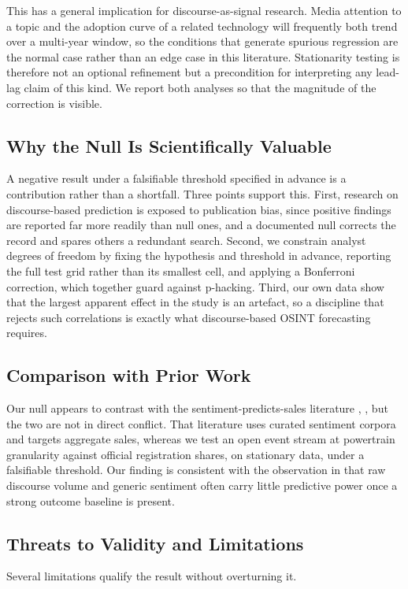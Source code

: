 \documentclass[conference]{IEEEtran}
\begin{document}
This has a general implication for discourse-as-signal research. Media attention
to a topic and the adoption curve of a related technology will frequently both
trend over a multi-year window, so the conditions that generate spurious
regression are the normal case rather than an edge case in this literature.
Stationarity testing is therefore not an optional refinement but a precondition
for interpreting any lead-lag claim of this kind. We report both analyses so
that the magnitude of the correction is visible.

\subsection{Why the Null Is Scientifically Valuable}
A negative result under a falsifiable threshold specified in advance is a
contribution rather than a shortfall. Three points support this. First,
research on discourse-based prediction is exposed to publication bias, since
positive findings are reported far more readily than null ones, and a documented
null corrects the record and spares others a redundant search. Second, we
constrain analyst degrees of freedom by fixing the hypothesis and threshold in
advance, reporting the full test grid rather than its smallest cell, and
applying a Bonferroni correction, which together guard against p-hacking. Third,
our own data show that the largest apparent effect in the study is an artefact,
so a discipline that rejects such correlations is exactly what
discourse-based OSINT forecasting requires.

\subsection{Comparison with Prior Work}
Our null appears to contrast with the sentiment-predicts-sales literature
\cite{shao2025}, \cite{liu2025}, but the two are not in direct conflict. That
literature uses curated sentiment corpora and targets aggregate sales, whereas
we test an open event stream at powertrain granularity against official
registration shares, on stationary data, under a falsifiable threshold. Our
finding is consistent with the observation in \cite{wijnhoven2017} that raw
discourse volume and generic sentiment often carry little predictive power once
a strong outcome baseline is present.

\subsection{Threats to Validity and Limitations}
Several limitations qualify the result without overturning it.
\end{document}
